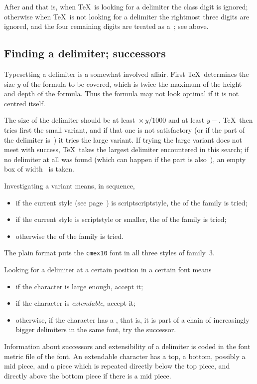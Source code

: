 After  and  \ldash that is, when \TeX\
is looking for a delimiter \rdash  the class digit is ignored;
otherwise \ldash when \TeX\ is not looking for a delimiter \rdash 
the rightmost three digits are ignored, and the
four remaining digits are treated as a~; see above.

\subsection{Finding a delimiter; successors}
\label{successor}

Typesetting a delimiter is a somewhat involved affair.
First \TeX\ determines the size $y$ of the formula to be covered,
which is twice the maximum of the height and depth of the
formula. Thus the formula may not look optimal if
it is not centred itself.

The size of the delimiter should be at least 
${}\times y/1000$ and at least 
$y-{}$.
\TeX\ then tries first the small variant, and if that one
is not satisfactory (or if the  part of the delimiter
is~) it tries the large variant. If trying the large variant
does not meet with success, \TeX\ takes the largest delimiter
encountered in this search; if no delimiter at all was found
(which can happen if  the  part is
\altt
also~),
an empty box of width~ is taken.

Investigating a variant means, in sequence,
\begin{itemize}
\item if the current style (see page~\pageref{math:styles}) is
  scriptscriptstyle, the  of the family is tried;
\item if the current style is scriptstyle or smaller, the
   of the family is tried;
\item otherwise the  of the family is tried.
\end{itemize}
The plain format puts the \verb-cmex10- font  in all three
styles of family~3.

Looking for a delimiter at a certain position in a certain font
means
\begin{itemize}
\item if the character is large enough, accept it;
\item if the character is
  \emph{extendable}, accept it;
\item otherwise, if the character has a , that
  is, it is part of a chain of increasingly bigger delimiters in the
  same font, try the successor.
\end{itemize}
Information about
successors and extensibility of a delimiter is coded in the font
metric file of the font.  An extendable character has a top, a bottom,
possibly a mid piece, and a piece which is repeated directly below the
top piece, and directly above the bottom piece if there is a mid
piece.

